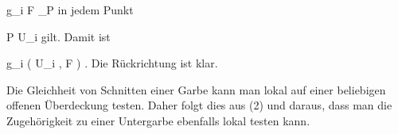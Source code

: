{{\mavergleichskette
{\vergleichskette
{g_i
}
{ \in }{ { \mathcal  F   }_P
}
{  }{
}
{    }{
}
{   }{
}
}
{}{}{}
in jedem Punkt

\mavergleichskette
{\vergleichskette
{P
}
{ \in }{ U_i
}
{  }{
}
{    }{
}
{   }{
}
}
{}{}{}
gilt. Damit ist

\mavergleichskette
{\vergleichskette
{g_i
}
{ \in }{ \Gamma   \left(  U_i ,  { \mathcal  F   }   \right)
}
{  }{
}
{    }{
}
{   }{
}
}
{}{}{.}
Die Rückrichtung ist klar.
}{Die Gleichheit von Schnitten einer Garbe kann man lokal auf einer beliebigen offenen Überdeckung testen. Daher folgt dies aus (2) und daraus, dass man die Zugehörigkeit zu einer Untergarbe ebenfalls lokal testen kann.
}




}
